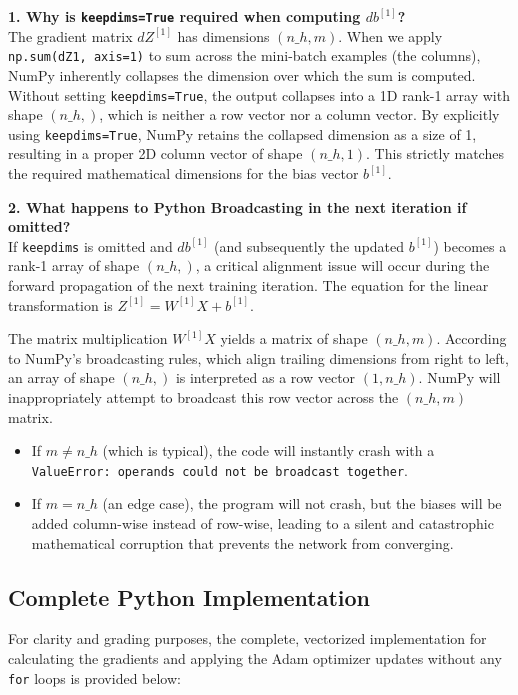 \documentclass{article}
\begin{document}
\textbf{1. Why is \texttt{keepdims=True} required when computing $db^{[1]}$?} \\
The gradient matrix $dZ^{[1]}$ has dimensions $(n\_h, m)$. When we apply \texttt{np.sum(dZ1, axis=1)} to sum across the mini-batch examples (the columns), NumPy inherently collapses the dimension over which the sum is computed. Without setting \texttt{keepdims=True}, the output collapses into a 1D rank-1 array with shape $(n\_h,)$, which is neither a row vector nor a column vector. By explicitly using \texttt{keepdims=True}, NumPy retains the collapsed dimension as a size of 1, resulting in a proper 2D column vector of shape $(n\_h, 1)$. This strictly matches the required mathematical dimensions for the bias vector $b^{[1]}$.

\vspace{0.3cm}
\textbf{2. What happens to Python Broadcasting in the next iteration if omitted?} \\
If \texttt{keepdims} is omitted and $db^{[1]}$ (and subsequently the updated $b^{[1]}$) becomes a rank-1 array of shape $(n\_h,)$, a critical alignment issue will occur during the forward propagation of the next training iteration. The equation for the linear transformation is $Z^{[1]} = W^{[1]} X + b^{[1]}$. 

The matrix multiplication $W^{[1]} X$ yields a matrix of shape $(n\_h, m)$. According to NumPy's broadcasting rules, which align trailing dimensions from right to left, an array of shape $(n\_h,)$ is interpreted as a row vector $(1, n\_h)$. NumPy will inappropriately attempt to broadcast this row vector across the $(n\_h, m)$ matrix. 
\begin{itemize}
	\item If $m \neq n\_h$ (which is typical), the code will instantly crash with a \texttt{ValueError: operands could not be broadcast together}.
	\item If $m = n\_h$ (an edge case), the program will not crash, but the biases will be added column-wise instead of row-wise, leading to a silent and catastrophic mathematical corruption that prevents the network from converging.
\end{itemize}

\newpage
\subsection{Complete Python Implementation}
For clarity and grading purposes, the complete, vectorized implementation for calculating the gradients and applying the Adam optimizer updates without any \texttt{for} loops is provided below:
\end{document}
